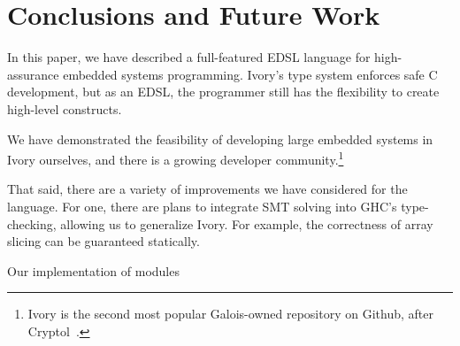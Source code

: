 \section{Conclusions and Future Work}
\label{sec:conclusion}

In this paper, we have described a full-featured EDSL language for
high-assurance embedded systems programming. Ivory's type system enforces safe C
development, but as an EDSL, the programmer still has the flexibility to create
high-level constructs.

We have demonstrated the feasibility of developing large embedded systems in
Ivory ourselves, and there is a growing developer community.\footnote{Ivory is the
second most popular Galois-owned repository on Github, after Cryptol~\cite{}.}

That said, there are a variety of improvements we have considered for the
language. For one, there are plans to integrate SMT solving into GHC's
type-checking, allowing us to generalize Ivory. For example, the correctness of
array slicing can be guaranteed statically.

Our implementation of modules



